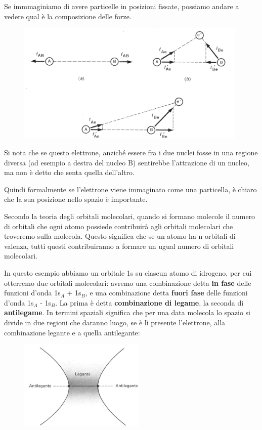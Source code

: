 Se immmaginiamo di avere particelle in posizioni fissate, possiamo andare a vedere qual è la composizione delle forze.

\begin{figure}[htp]
    \centering
    \includegraphics[width=11cm]{immagini/posizone_elettrone.png}
\end{figure}

Si nota che se questo elettrone, anziché essere fra i due nuclei fosse in una regione diversa (ad esempio a destra del nucleo B) sentirebbe l'attrazione di un nucleo, ma non è detto che senta quella dell'altro.

Quindi formalmente se l'elettrone viene immaginato come una particella, è chiaro che la sua posizione nello spazio è importante.

Secondo la teoria degli orbitali molecolari, quando si formano molecole il numero di orbitali che ogni atomo possiede contribuirà agli orbitali molecolari che troveremo sulla molecola. Questo significa che se un atomo ha n orbitali di valenza, tutti questi contribuiranno a formare un ugual numero di orbitali molecolari.

In questo esempio abbiamo un orbitale 1s su ciascun atomo di idrogeno, per cui otterremo due orbitali molecolari: avremo una combinazione detta \textbf{in fase} delle funzioni d'onda 1s$_A$ + 1s$_B$, e una combinazione detta \textbf{fuori fase} delle funzioni d'onda 1s$_A$ - 1s$_B$. La prima è detta \textbf{combinazione di legame}, la seconda di \textbf{antilegame}. In termini spaziali significa che per una data molecola lo spazio si divide in due regioni che daranno luogo, se è lì presente l'elettrone, alla combinazione legante e a quella antilegante:

\begin{figure}[htp]
    \centering
    \includegraphics[width=6cm]{immagini/spazio_legante_antilegante.png}
\end{figure}

